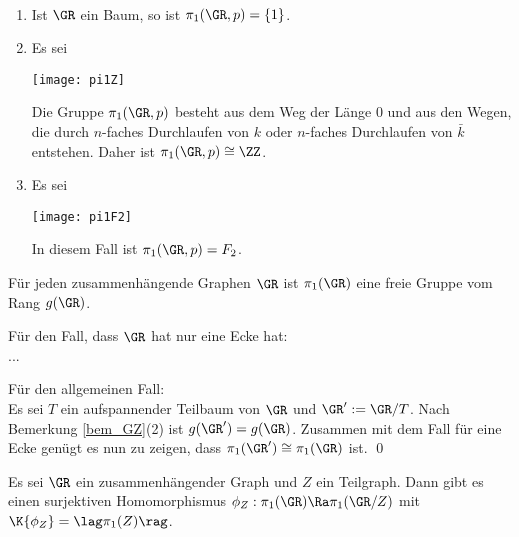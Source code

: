 \BSP\
\begin{enumerate}
\item Ist $\GR$ ein Baum, so ist $\pi_1(\GR,p)=\{1\}$.
\item Es sei
\begin{center}
	\texttt{[image: pi1Z]}
\end{center}
Die Gruppe $\pi_1(\GR,p)$ besteht aus dem Weg der Länge $0$
und aus den Wegen, die durch
$n$-faches Durchlaufen von $k$ oder $n$-faches Durchlaufen von
$\bar{k}$ entstehen. Daher ist $\pi_1(\GR,p)\cong\ZZ$.
\item Es sei
\begin{center}
	\texttt{[image: pi1F2]}
\end{center}
In diesem Fall ist $\pi_1(\GR,p)=F_2$.
\end{enumerate}

\PROP Für jeden zusammenhängende Graphen $\GR$ ist $\pi_1(\GR)$
eine freie Gruppe vom Rang $g(\GR)$.

\bew Für den Fall, dass $\GR$ hat nur eine Ecke hat:\\
...

Für den allgemeinen Fall:\\
Es sei $T$ ein aufspannender Teilbaum
von $\GR$ und $\GR':=\GR/T$. Nach Bemerkung \ref{bem_GZ}(2) ist
$g(\GR')=g(\GR)$. Zusammen mit dem Fall für eine Ecke genügt es
nun zu zeigen, dass $\pi_1(\GR')\cong\pi_1(\GR)$ ist.
\qed

\BEM Es sei $\GR$ ein zusammenhängender Graph und $Z$ ein Teilgraph.
Dann gibt es einen surjektiven Homomorphismus
$\phi_Z:\pi_1(\GR)\Ra\pi_1(\GR/Z)$ mit
$\K{\phi_Z}=\lag\pi_1(Z)\rag$.